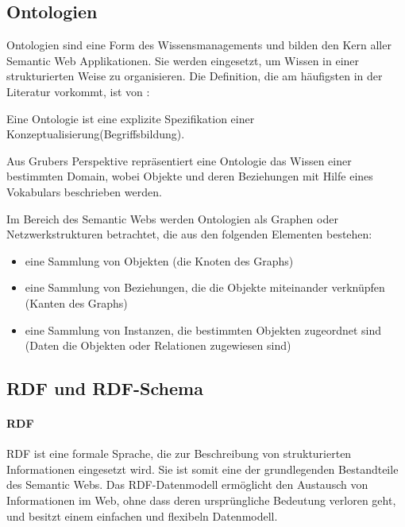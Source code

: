 \subsection{Ontologien}

Ontologien sind eine Form des Wissensmanagements und bilden den Kern aller Semantic Web Applikationen. 
Sie werden eingesetzt, um Wissen in einer strukturierten Weise zu organisieren.
Die Definition, die am häufigsten in der Literatur vorkommt, ist von \citet{gruber_translation_1993}:

\begin{definition}
  Eine Ontologie ist eine explizite Spezifikation einer Konzeptualisierung(Begriffsbildung).
\end{definition}

\noindent Aus Grubers Perspektive repräsentiert eine Ontologie das Wissen einer bestimmten Domain, wobei Objekte und deren Beziehungen mit Hilfe eines Vokabulars beschrieben werden. \citep[vgl.]{breitman_semantic_2007}

Im Bereich des Semantic Webs werden Ontologien als Graphen oder Netzwerkstrukturen betrachtet, die aus den folgenden Elementen bestehen:

\begin{itemize}
	\item eine Sammlung von Objekten (die Knoten des Graphs)
	\item eine Sammlung von Beziehungen, die die Objekte miteinander verknüpfen (Kanten des Graphs)
	\item eine Sammlung von Instanzen, die bestimmten Objekten zugeordnet sind (Daten die Objekten oder Relationen zugewiesen sind) \citep[vgl.]{davies_semantic_2006}
\end{itemize}

\subsection{RDF und RDF-Schema} 

\paragraph{RDF}

\ac{RDF} ist eine formale Sprache, die zur Beschreibung von strukturierten Informationen eingesetzt wird. 
Sie ist somit eine der grundlegenden Bestandteile des Semantic Webs.
Das \ac{RDF}-Datenmodell ermöglicht den Austausch von Informationen im Web, ohne dass deren ursprüngliche Bedeutung verloren geht, und besitzt einem einfachen und flexibeln Datenmodell. \citep[vgl.]{linkeddatavisualization}

